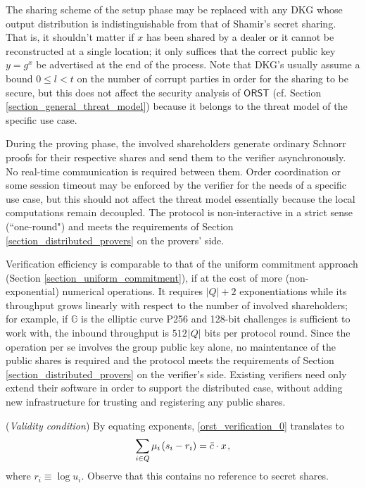 \documentclass{iacrtrans}
\begin{document}
\noindent
The sharing scheme of the setup phase may be replaced
with any DKG whose output distribution
is indistinguishable from that of Shamir's secret sharing.
That is, it shouldn't matter if $x$ has been shared by a dealer
or it cannot be reconstructed at a single location; it only
suffices that the correct public key
$y = g ^ x$ be advertised at the end of the process.
Note that DKG's usually assume a bound $0 \le l < t$
on the number of corrupt parties
in order for the sharing to be secure,
but this does not affect the security analysis of
$\mathsf{ORST}$
(cf. Section \ref{section_general_threat_model})
because it belongs to the threat model of the
specific use case.

During the proving phase,
the involved shareholders generate ordinary Schnorr
proofs for their respective shares
and send them to the verifier asynchronously.
No real-time communication is required between them.
Order coordination or some session timeout
may be enforced by the verifier for the needs of a specific use case,
but this should not affect the threat model essentially
because the local computations remain decoupled.
The protocol is non-interactive in a strict sense
(``one-round") and meets the requirements of
Section \ref{section_distributed_provers} on the provers' side.

Verification efficiency is comparable to that of the uniform
commitment approach (Section \ref{section_uniform_commitment}),
if at the cost of more (non-exponential) numerical operations.
It requires $|Q| + 2$ exponentiations
while its throughput grows linearly
with respect to the number of involved shareholders;
for example, if $\mathbb{G}$ is the elliptic curve P256 and
128-bit challenges is sufficient to work with,
the inbound throughput is $512 \hspace{1pt} |Q|$ bits per protocol round.
Since the operation per se involves
the group public key alone, no maintentance of the public shares is
required and the protocol meets
the requirements of Section \ref{section_distributed_provers}
on the verifier's side.
Existing verifiers need only extend
their software in order to support the distributed case,
without adding new infrastructure
for trusting and registering any public shares.

\begin{rem}\label{rem_orst_verification_exponents}
(\textit{Validity condition})
By equating exponents,
\eqref{orst_verification_0} translates to
\vspace{5pt}
\begin{equation}\label{orst_verification_exponents}
\sum_{i \in Q} \mu_i\hspace{1pt} (s_i - r_i) =
\bar{c} \cdot x\hspace{1pt},
\vspace{5pt}
\end{equation}
where $r_i \equiv \log u_i$.
Observe that this contains no reference to secret shares.
\end{rem}
\end{document}
